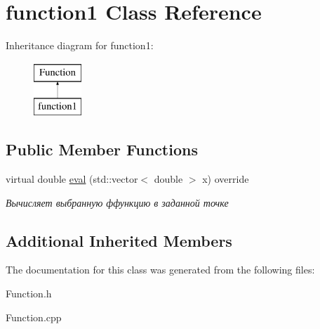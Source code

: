 \hypertarget{classfunction1}{}\section{function1 Class Reference}
\label{classfunction1}
Inheritance diagram for function1\+:\begin{figure}[H]
\begin{center}
\leavevmode
\includegraphics[height=2.000000cm]{classfunction1}
\end{center}
\end{figure}
\subsection*{Public Member Functions}
\begin{DoxyCompactItemize}
\item 
\mbox{\label{classfunction1_afcf1eb63c3348dfc970d7e439d7386c9}} 
virtual double \mbox{\hyperlink{classfunction1_afcf1eb63c3348dfc970d7e439d7386c9}{eval}} (std\+::vector$<$ double $>$ x) override
\begin{DoxyCompactList}\small\item\em Вычисляет выбранную ффункцию в заданной точке \end{DoxyCompactList}\end{DoxyCompactItemize}
\subsection*{Additional Inherited Members}


The documentation for this class was generated from the following files\+:\begin{DoxyCompactItemize}
\item 
Function.\+h\item 
Function.\+cpp\end{DoxyCompactItemize}
